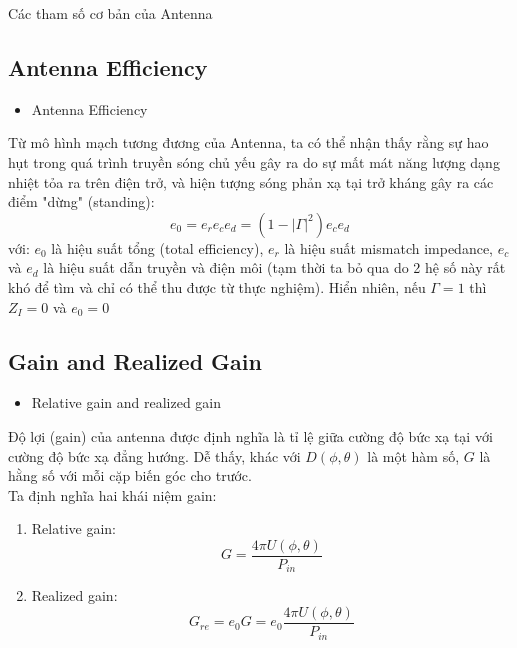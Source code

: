 \documentclass[8pt]{beamer}
\begin{document}
\begin{frame}{Các tham số cơ bản của Antenna}
\subsection{Antenna Efficiency}
\begin{itemize}
	\item Antenna Efficiency
\end{itemize}
Từ mô hình mạch tương đương của Antenna, ta có thể nhận thấy rằng sự hao hụt trong quá trình truyền sóng chủ yếu gây ra do sự mất mát năng lượng dạng nhiệt tỏa ra trên điện trở, và hiện tượng sóng phản xạ tại trở kháng gây ra các điểm "dừng" (standing):
$$e_{0}=e_{r}e_{c}e_{d}=(1-|\Gamma|^2)e_{c}e_{d}$$
với: $e_{0}$ là hiệu suất tổng (total efficiency), $e_{r}$ là hiệu suất mismatch impedance, $e_{c}$ và $e_{d}$ là hiệu suất dẫn truyền và điện môi (tạm thời ta bỏ qua do 2 hệ số này rất khó để tìm và chỉ có thể thu được từ thực nghiệm). Hiển nhiên, nếu $\Gamma=1$ thì $Z_{I}=0$ và $e_{0}=0$
\subsection{Gain and Realized Gain}
\begin{itemize}
	\item Relative gain and realized gain
\end{itemize}
Độ lợi (gain) của antenna được định nghĩa là tỉ lệ giữa cường độ bức xạ tại  với cường độ bức xạ đẳng hướng. Dễ thấy, khác với $D(\phi,\theta)$ là một hàm số, $G$ là hằng số với mỗi cặp biến góc cho trước.
\\ Ta định nghĩa hai khái niệm gain:
\begin{enumerate}
	\item Relative gain: $$G=\frac{4\pi U(\phi,\theta)}{P_{in}}$$
	\item Realized gain: $$G_{re}=e_{0} G=e_{0}\frac{4\pi U(\phi,\theta)}{P_{in}}$$
\end{enumerate}
\end{frame}
\end{document}
